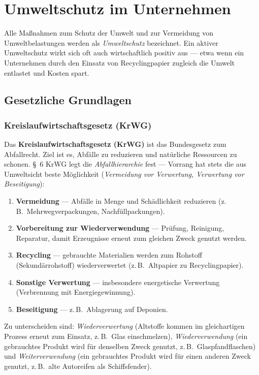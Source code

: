 \documentclass[11pt, a4paper]{article}
\begin{document}
\section{Umweltschutz im Unternehmen}

Alle Maßnahmen zum Schutz der Umwelt und zur Vermeidung von Umweltbelastungen werden
als \emph{Umweltschutz} bezeichnet. Ein aktiver Umweltschutz wirkt sich oft auch
wirtschaftlich positiv aus --- etwa wenn ein Unternehmen durch den Einsatz von
Recyclingpapier zugleich die Umwelt entlastet und Kosten spart.

\subsection{Gesetzliche Grundlagen}

\subsubsection{Kreislaufwirtschaftsgesetz (KrWG)}

Das \textbf{Kreislaufwirtschaftsgesetz (KrWG)} ist das Bundesgesetz zum Abfallrecht.
Ziel ist es, Abfälle zu reduzieren und natürliche Ressourcen zu schonen. \S~6 KrWG legt
die \emph{Abfallhierarchie} fest --- Vorrang hat stets die aus Umweltsicht beste
Möglichkeit (\emph{Vermeidung vor Verwertung, Verwertung vor Beseitigung}):

\begin{enumerate}
  \item \textbf{Vermeidung} --- Abfälle in Menge und Schädlichkeit reduzieren (z.\,B.\ Mehrwegverpackungen, Nachfüllpackungen).
  \item \textbf{Vorbereitung zur Wiederverwendung} --- Prüfung, Reinigung, Reparatur, damit Erzeugnisse erneut zum gleichen Zweck genutzt werden.
  \item \textbf{Recycling} --- gebrauchte Materialien werden zum Rohstoff (Sekundärrohstoff) wiederverwertet (z.\,B.\ Altpapier zu Recyclingpapier).
  \item \textbf{Sonstige Verwertung} --- insbesondere energetische Verwertung (Verbrennung mit Energiegewinnung).
  \item \textbf{Beseitigung} --- z.\,B.\ Ablagerung auf Deponien.
\end{enumerate}

Zu unterscheiden sind: \emph{Wiederverwertung} (Altstoffe kommen im gleichartigen Prozess
erneut zum Einsatz, z.\,B.\ Glas einschmelzen), \emph{Wiederverwendung} (ein gebrauchtes
Produkt wird für denselben Zweck genutzt, z.\,B.\ Glaspfandflaschen) und
\emph{Weiterverwendung} (ein gebrauchtes Produkt wird für einen anderen Zweck genutzt,
z.\,B.\ alte Autoreifen als Schiffsfender).
\end{document}

